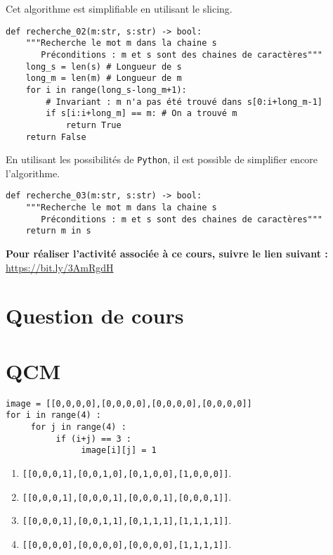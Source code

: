 Cet algorithme est simplifiable en utilisant le slicing.
\begin{lstlisting}
def recherche_02(m:str, s:str) -> bool:
    """Recherche le mot m dans la chaine s
       Préconditions : m et s sont des chaines de caractères"""
    long_s = len(s) # Longueur de s
    long_m = len(m) # Longueur de m
    for i in range(long_s-long_m+1): 
        # Invariant : m n'a pas été trouvé dans s[0:i+long_m-1]
        if s[i:i+long_m] == m: # On a trouvé m
            return True
    return False
\end{lstlisting}

En utilisant les possibilités de \texttt{Python}, il est possible de simplifier encore l'algorithme. 

\begin{lstlisting}
def recherche_03(m:str, s:str) -> bool:
    """Recherche le mot m dans la chaine s
       Préconditions : m et s sont des chaines de caractères"""
    return m in s
\end{lstlisting}




\textbf{Pour réaliser l'activité associée à ce cours, suivre le lien suivant : }
\url{https://bit.ly/3AmRgdH}

\newpage
\section*{Question de cours}


\section*{QCM}





\begin{lstlisting}
image = [[0,0,0,0],[0,0,0,0],[0,0,0,0],[0,0,0,0]]
for i in range(4) :
     for j in range(4) :
          if (i+j) == 3 :
               image[i][j] = 1
\end{lstlisting}
\begin{enumerate}
\item \texttt{[[0,0,0,1],[0,0,1,0],[0,1,0,0],[1,0,0,0]]}. %
\item \texttt{[[0,0,0,1],[0,0,0,1],[0,0,0,1],[0,0,0,1]]}.
\item \texttt{[[0,0,0,1],[0,0,1,1],[0,1,1,1],[1,1,1,1]]}.
\item \texttt{[[0,0,0,0],[0,0,0,0],[0,0,0,0],[1,1,1,1]]}.
\end{enumerate}


